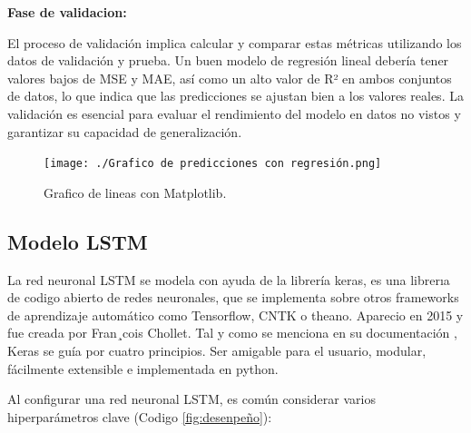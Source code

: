 \textbf{Fase de validacion:}

El proceso de validación implica calcular y comparar estas métricas utilizando
los datos de validación y prueba. Un buen modelo de regresión lineal debería
tener valores bajos de MSE y MAE, así como un alto valor de R² en ambos
conjuntos de datos, lo que indica que las predicciones se ajustan bien a los
valores reales. La validación es esencial para evaluar el rendimiento del
modelo en datos no vistos y garantizar su capacidad de generalización.


\begin{figure}[H]
  \begin{center}
    \texttt{[image: ./Grafico de predicciones con regresión.png]}
    \caption{Grafico de lineas con Matplotlib.}
    \label{fig:prediccion_regresion_cap3}
  \end{center}
\end{figure}

\subsection{Modelo LSTM}

La red neuronal LSTM se modela con ayuda de la librería keras, es una librerıa
de codigo abierto de redes neuronales, que se implementa sobre otros frameworks
de aprendizaje automático como Tensorflow, CNTK o theano. Aparecio en 2015 y
fue creada por Fran¸cois Chollet. Tal y como se menciona en su documentación
\cite{keras-doc}, Keras se guía por cuatro principios. Ser amigable para el
usuario, modular, fácilmente extensible e implementada en python.

\vspace{1\baselineskip}
Al configurar una red neuronal LSTM, es común considerar varios hiperparámetros
clave (Codigo \ref{fig:desenpeño}):

